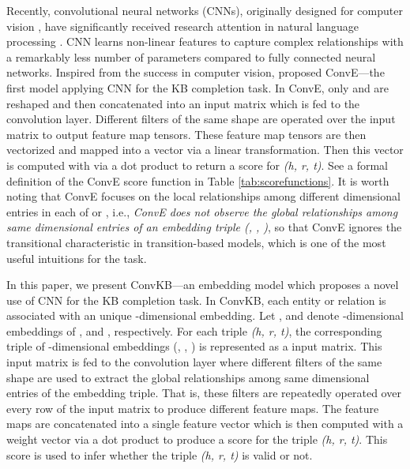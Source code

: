 \documentclass[11pt,a4paper]{article}
\begin{document}
Recently, convolutional neural networks (CNNs), originally designed for computer vision \citep{lecun1998gradient},  have significantly received research attention  in natural language processing \citep{collobert2011natural,kim2014convolutional}.
CNN learns non-linear features to capture complex relationships with a remarkably less number of parameters compared to fully connected neural networks.
Inspired from the success in computer vision, \citet{Dettmers2017} proposed ConvE---the first model applying CNN for the KB completion task.
In ConvE, only  and  are reshaped and then concatenated into an input matrix which is fed to the convolution layer.
Different filters  of the same  shape are operated over the input matrix to output feature map tensors. These feature map tensors are  then vectorized and mapped into a vector via a linear transformation.
Then this vector is computed with  via a dot product to return a score for \textit{(h, r, t)}. See  a formal definition of the ConvE score function in Table \ref{tab:scorefunctions}. 
It is worth noting  that ConvE  focuses on the local relationships among different dimensional entries in each of  or , i.e., \emph{ConvE does not observe the global relationships among same dimensional entries of an embedding triple (, , )}, so that ConvE ignores the transitional characteristic in  transition-based models, which is one of the most useful intuitions for the task.

In this paper, we present ConvKB---an embedding model which proposes a novel use of CNN for the KB completion task. In ConvKB, each entity or relation is associated with an unique -dimensional embedding. Let ,  and  denote  -dimensional embeddings of ,  and , respectively. 
For each triple \textit{(h, r, t)}, the corresponding triple of -dimensional  embeddings (, , ) is represented as a   input matrix. 
This input matrix is fed to the convolution layer where different filters of the same  shape are used to extract the global relationships among same dimensional entries of the embedding triple.
That is, these filters are repeatedly operated over every row of the input matrix to produce different feature maps. The  feature maps are concatenated into a single feature vector which is then computed with a weight vector via a dot product to produce a score for the triple  \textit{(h, r, t)}. 
This score is used to infer whether the triple \textit{(h, r, t)} is valid or not.
\end{document}
